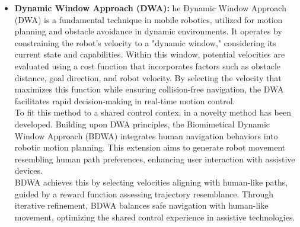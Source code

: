 \begin{itemize}
    \item\textbf{Dynamic Window Approach (DWA):} he Dynamic Window Approach (DWA) is a fundamental technique in mobile robotics, utilized for motion planning and obstacle avoidance in dynamic environments. 
    It operates by constraining the robot's velocity to a "dynamic window," considering its current state and capabilities. 
    Within this window, potential velocities are evaluated using a cost function that incorporates factors such as obstacle distance, goal direction, and robot velocity. 
    By selecting the velocity that maximizes this function while ensuring collision-free navigation, the DWA facilitates rapid decision-making in real-time motion control.\\ 
    To fit this method to a shared control contex, in \cite{7932524} a novelty method has been developed. 
    Building upon DWA principles, the Biomimetical Dynamic Window Approach (BDWA) integrates human navigation behaviors into robotic motion planning. 
    This extension aims to generate robot movement resembling human path preferences, enhancing user interaction with assistive devices.\\ 
    BDWA achieves this by selecting velocities aligning with human-like paths, guided by a reward function assessing trajectory resemblance. 
    Through iterative refinement, BDWA balances safe navigation with human-like movement, optimizing the shared control experience in assistive technologies.\\ 


\end{itemize}    

